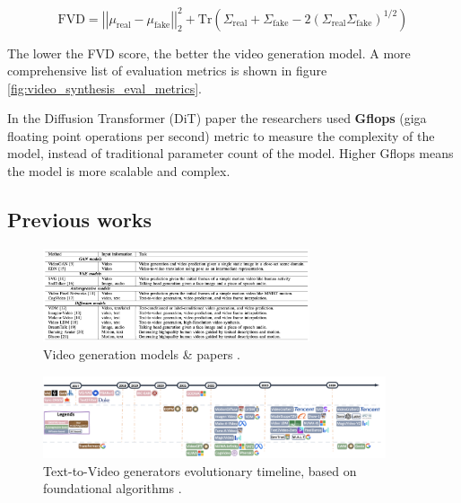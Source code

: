 \begin{equation*}
    \text{FVD} = \left| \left| \mu_{\text{real}} - \mu_{\text{fake}} \right| \right|^2_2 + \text{Tr} \left( \Sigma_{\text{real}} + \Sigma_{\text{fake}} - 2 \left( \Sigma_{\text{real}} \Sigma_{\text{fake}} \right)^{1/2} \right)
\end{equation*}

The lower the FVD score, the better the video generation model. A more comprehensive list of evaluation metrics is shown in figure \ref{fig:video_synthesis_eval_metrics}.

In the Diffusion Transformer (DiT) paper \cite{diffusion_transformer} the researchers used \textbf{Gflops} (giga floating point operations per second) metric to measure the complexity of the model, instead of traditional parameter count of the model. Higher Gflops means the model is more scalable and complex.








\subsection{Previous works}

\begin{figure}
    \centering
    \includegraphics[width=0.7\textwidth]{images/video_synthesis/previous_works.png}
    \caption{Video generation models \& papers \cite{zhou2024survey}.}
\end{figure}

\begin{figure}
    \centering
    \includegraphics[width=0.9\textwidth]{images/video_synthesis/timeline.png}
    \caption{Text-to-Video generators evolutionary timeline, based on foundational algorithms \cite{sun2024sora}.}
\end{figure}

